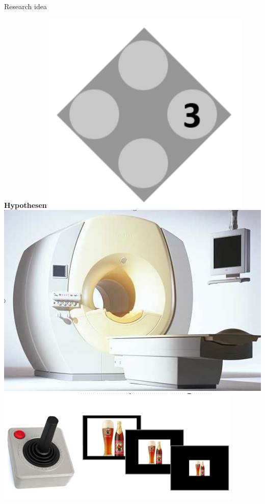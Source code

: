 \documentclass{bredelebeamer}
\begin{document}
\begin{frame}{Research idea}
\begin{block}{\textbf{Hypothesen}}
\hspace{7mm}
 \includegraphics[scale=0.28]{images/nback.PNG}
 \hspace{4mm}
 \includegraphics[scale=0.15]{images/scanner.PNG}
 \hspace{4mm}
 \includegraphics[scale=0.48]{images/aat.PNG}

\end{block}
\end{frame}
\end{document}
